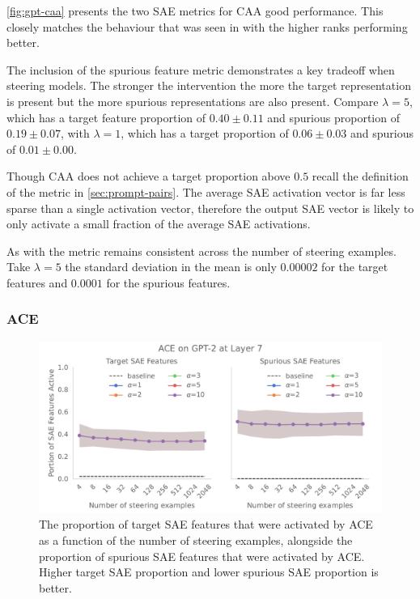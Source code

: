\cref{fig:gpt-caa} presents the two SAE metrics for CAA good performance.
This closely matches the behaviour that was seen in \citet{steering-clear} with the higher ranks performing better.

The inclusion of the spurious feature metric demonstrates a key tradeoff when steering models.
The stronger the intervention the more the target representation is present but the more spurious representations are also present.
Compare $\lambda = 5$, which has a target feature proportion of $0.40 \pm 0.11$ and spurious proportion of $0.19 \pm 0.07$, with $\lambda = 1$, which has a target proportion of $0.06 \pm 0.03$ and spurious of $0.01 \pm 0.00$.

Though CAA does not achieve a target proportion above $0.5$ recall the definition of the metric in \cref{sec:prompt-pairs}.
The average SAE activation vector is far less sparse than a single activation vector, therefore the output SAE vector is likely to only activate a small fraction of the average SAE activations.

As with \citet{steering-clear} the metric remains consistent across the number of steering examples.
Take $\lambda = 5$ the standard deviation in the mean is only $0.00002$ for the target features and $0.0001$ for the spurious features.

\subsubsection{ACE}

\begin{figure}
    \centering
    \captionsetup{width=.9\textwidth}
    \includegraphics[width=\textwidth]{figures/gpt2_7_ace.pdf}
    \caption{
        The proportion of target SAE features that were activated by ACE as a function of the number of steering examples, alongside the proportion of spurious SAE features that were activated by ACE.
        Higher target SAE proportion and lower spurious SAE proportion is better.
    }
    \label{fig:gpt-ace}
\end{figure}

